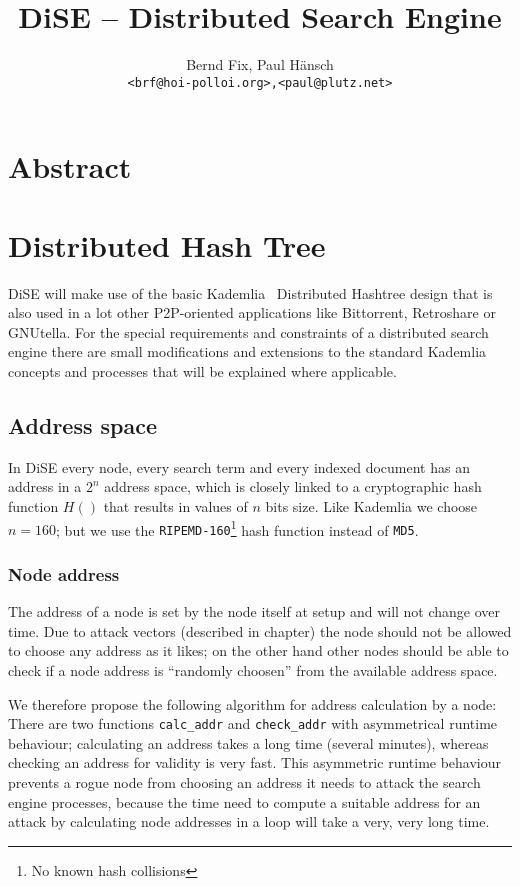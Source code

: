 \documentclass[a4paper,8pt,twocolumn]{scrartcl}
\title{DiSE -- Distributed Search Engine}
\author{Bernd Fix, Paul H\"ansch \\ \tt{<brf@hoi-polloi.org>,<paul@plutz.net>}}
\begin{document}


\maketitle

\section{Abstract}


\section{Distributed Hash Tree}

DiSE will make use of the basic Kademlia~\cite{Maymounkov:2002:KPI:646334.687801} Distributed Hashtree design that is also used in a lot other P2P-oriented applications like Bittorrent, Retroshare or GNUtella. For the special requirements and constraints of a distributed search engine there are small modifications and extensions to the standard Kademlia concepts and processes that will be explained where applicable.

\subsection{Address space}

In DiSE every node, every search term and every indexed document has an address in a $2^n$ address space, which is closely linked to a cryptographic hash function $H()$ that results in values of $n$ bits size. Like Kademlia we choose $n = 160$; but we use the {\tt RIPEMD-160}\footnote{No known hash collisions} hash function instead of {\tt MD5}.

\subsubsection{Node address}

The address of a node is set by the node itself at setup and will not change over time. Due to attack vectors (described in chapter) the node should not be allowed to choose any address as it likes; on the other hand other nodes should be able to check if a node address is ``randomly choosen'' from the available address space.

We therefore propose the following algorithm for address calculation by a node: There are two functions {\tt calc\_addr} and {\tt check\_addr} with asymmetrical runtime behaviour; calculating an address takes a long time (several minutes), whereas checking an address for validity is very fast.  This asymmetric runtime behaviour prevents a rogue node from choosing an address it needs to attack the search engine processes, because the time need to compute a suitable address for an attack by calculating node addresses in a loop will take a very, very long time.
\end{document}
